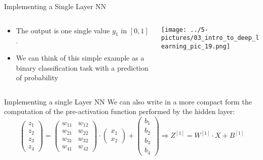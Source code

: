 \documentclass[11pt]{beamer}
\begin{document}
\begin{frame}{Implementing a Single Layer NN}
\begin{columns}[T] %
\begin{column}{.48\textwidth}
\begin{itemize}
\item The output is one single value $y_1$ in $[0, 1]$. 
\item We can think of this simple example as a binary classification 
task with a prediction of probability
\end{itemize}
\end{column}%
\hfill%
\begin{column}{.48\textwidth}
        \texttt{[image: ../5-pictures/03\_intro\_to\_deep\_learning\_pic\_19.png]}
\end{column}%
\end{columns}
\end{frame}
\begin{frame}{Implementing a single Layer NN}
We can also write in a more compact form the computation of the pre-activation function performed by the hidden layer:
\begin{equation}
\begin{pmatrix}
z_1 \\ z_2 \\ z_3 \\ z_4
\end{pmatrix} =
\begin{pmatrix}
w_{11} & w_{12} \\ w_{21} & w_{22} \\ w_{31} & w_{32} \\ w_{41} & w_{42}
\end{pmatrix} 
\cdot 
\begin{pmatrix}
x_1 \\ x_2 
\end{pmatrix}
+
\begin{pmatrix}
b_1 \\ b_2 \\ b_3 \\ b_4
\end{pmatrix} 
\Rightarrow Z^{[1]} = W^{[1]} \cdot X + B^{[1]} 
\end{equation}

\end{frame}
\end{document}
